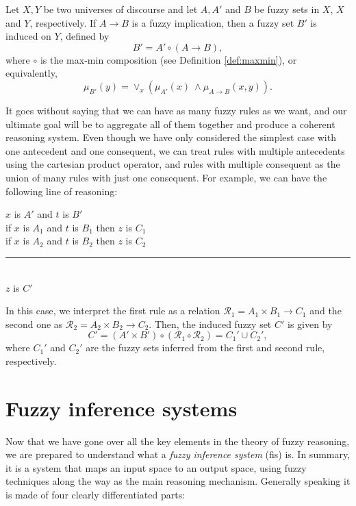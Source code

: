 \begin{definition} Let $X,Y$ be two universes of discourse and let $A, A'$ and $B$ be fuzzy sets in $X$, $X$ and $Y$, respectively. If $A\to B$ is a fuzzy implication, then a fuzzy set $B'$ is induced on $Y$, defined by
\[
B' = A' \circ (A \to B),
\]
where $\circ$ is the max-min composition (see Definition \ref{def:maxmin}), or equivalently,
\[
\mu_{B'}(y) = \lor_x (\mu_{A'}(x) \ \land \mu_{A \to B}(x, y)).
\]

\end{definition}

It goes without saying that we can have as many fuzzy rules as we want, and our ultimate goal will be to aggregate all of them together and produce a coherent reasoning system. Even though we have only considered the simplest case with one antecedent and one consequent, we can treat rules with multiple antecedents using the cartesian product operator, and rules with multiple consequent as the union of many rules with just one consequent. For example, we can have the following line of reasoning:

	\begin{center}
	  $x$ is $A'$ and $t$ is $B'$\\
    if $x$ is $A_1$ and $t$ is $B_1$ then $z$ is $C_1$\\
    if $x$ is $A_2$ and $t$ is $B_2$ then $z$ is $C_2$\\
    \rule{7cm}{0.4pt}\\
    $z$ is $C'$
  \end{center}
In this case, we interpret the first rule as a relation $\mathcal R_1 = A_1 \times B_1 \to C_1$ and the second one as $\mathcal R_2 = A_2 \times B_2 \to C_2$. Then, the induced fuzzy set $C'$ is given by
\[
C' = (A' \times B') \circ (\mathcal R_1 \circ \mathcal R_2) = C_1' \cup C_2',
\]
where $C_1'$ and $C_2'$ are the fuzzy sets inferred from the first and second rule, respectively.

\section{Fuzzy inference systems}

Now that we have gone over all the key elements in the theory of fuzzy reasoning, we are prepared to understand what a \textit{fuzzy inference system} (\acrshort{fis}) is. In summary, it is a system that maps an input space to an output space, using fuzzy techniques along the way as the main reasoning mechanism. Generally speaking it is made of four clearly differentiated parts:

